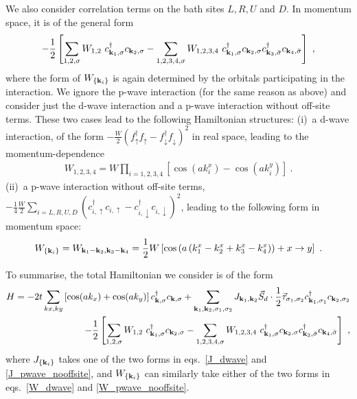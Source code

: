 \documentclass{revtex4-2}
\begin{document}
We also consider correlation terms on the bath sites \(L,R,U\) and \(D\). In momentum space, it is of the general form
\begin{equation}\begin{aligned}
	-\frac{1}{2}\left[\sum_{1,2,\sigma}W_{1,2}~ c^\dagger_{{\bf k}_1,\sigma}c_{{\bf k}_2,\sigma} - \sum_{1, 2, 3, 4,\sigma}W_{1,2,3,4}~ c^\dagger_{{\bf k}_1,\sigma}c_{{\bf k}_2,\sigma}c^\dagger_{{\bf k}_3,\bar\sigma}c_{{\bf k}_4,\bar\sigma}\right] ~,
\end{aligned}\end{equation}
where the form of \(W_{\left\{{\bf k}_i\right\}}\) is again determined by the orbitals participating in the interaction. We ignore the p-wave interaction (for the same reason as above) and consider just the d-wave interaction and a p-wave interaction without off-site terms. These two cases lead to the following Hamiltonian structures:
(i)~a d-wave interaction, of the form \(-\frac{W}{2}\left(f^\dagger_{\uparrow}f_{\uparrow} - f^\dagger_{\downarrow}f_{\downarrow}\right)^2\) in real space, leading to the momentum-dependence
\begin{equation}\begin{aligned}\label{W_dwave}
	W_{1,2,3,4} = W\prod_{i=1,2,3,4}\left[\cos\left( ak_i^x \right) - \cos\left( ak_i^y \right) \right]~.
\end{aligned}\end{equation}
(ii)~a p-wave interaction without off-site terms, \(-\frac{1}{4}\frac{W}{2}\sum_{i=L,R,U,D}\left(c^\dagger_{i,\uparrow}c_{i,\uparrow} - c^\dagger_{i,\downarrow}c_{i,\downarrow}\right)^2\), leading to the following form in momentum space:
\begin{equation}\begin{aligned}\label{W_pwave_nooffsite}
	W_{\left\{{\bf k}_i\right\}} = W_{{\bf k}_1 - {\bf k}_2, {\bf k}_3 - {\bf k}_4} = \frac{1}{2}W\left[\cos\left(a\left(k_1^x - k_2^x + k_3^x - k_4^x\right)\right) + x \to y\right]~.
\end{aligned}\end{equation}

To summarise, the total Hamiltonian we consider is of the form
\begin{equation}\begin{aligned}\label{hamiltonian}
	H = -2t\sum_{kx,k y}\left[\cos(ak_x) + \cos(ak_y)\right] c^\dagger_{{\bf k},\sigma}c_{{\bf k},\sigma} + \sum_{{\bf k}_1, {\bf k}_2, \sigma_1, \sigma_2} J_{{\bf k}_1, {\bf k}_2} \vec{S}_d\cdot\frac{1}{2}\vec{\tau}_{\sigma_1,\sigma_2} c^\dagger_{{\bf k}_1,\sigma_1}c_{{\bf k}_2,\sigma_2} \\
-\frac{1}{2}\left[\sum_{1,2,\sigma}W_{1,2}~ c^\dagger_{{\bf k}_1,\sigma}c_{{\bf k}_2,\sigma} - \sum_{1, 2, 3, 4,\sigma}W_{1,2,3,4}~ c^\dagger_{{\bf k}_1,\sigma}c_{{\bf k}_2,\sigma}c^\dagger_{{\bf k}_3,\bar\sigma}c_{{\bf k}_4,\bar\sigma}\right]~,
\end{aligned}\end{equation}
where \(J_{\left\{ {\bf k}_i \right\} }\) takes one of the two forms in eqs.~\ref{J_dwave} and \ref{J_pwave_nooffsite}, and \(W_{\left\{{\bf k}_i\right\}}\) can similarly take either of the two forms in eqs.~\ref{W_dwave} and \ref{W_pwave_nooffsite}. 
\end{document}
